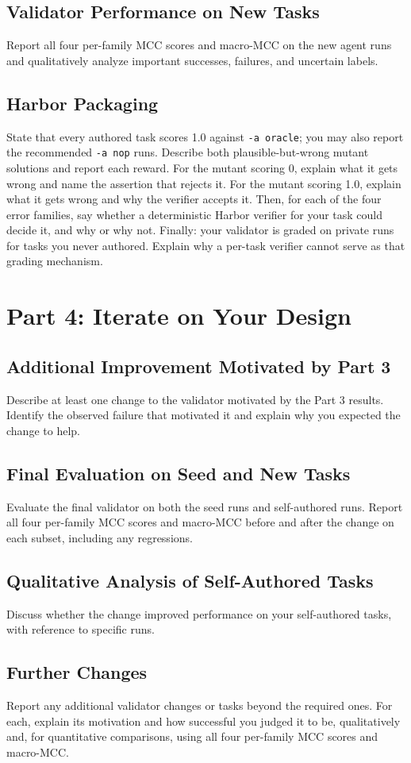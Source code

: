 \documentclass[11pt]{article}
\begin{document}
\subsection{Validator Performance on New Tasks}
Report all four per-family MCC scores and macro-MCC on the new agent runs and qualitatively
analyze important successes, failures, and uncertain labels.

\subsection{Harbor Packaging}
State that every authored task scores 1.0 against \texttt{-a oracle}; you may
also report the recommended \texttt{-a nop} runs. Describe both plausible-but-wrong
mutant solutions and report each reward. For the mutant scoring 0, explain what
it gets wrong and name the assertion that rejects it. For the mutant scoring
1.0, explain what it gets wrong and why the verifier accepts it. Then, for each
of the four error families, say whether a deterministic Harbor verifier for your
task could decide it, and why or why not. Finally: your validator is graded on
private runs for tasks you never authored. Explain why a per-task verifier
cannot serve as that grading mechanism.

\section{Part 4: Iterate on Your Design}

\subsection{Additional Improvement Motivated by Part 3}
Describe at least one change to the validator motivated by the Part 3 results.
Identify the observed failure that motivated it and explain why you expected
the change to help.

\subsection{Final Evaluation on Seed and New Tasks}
Evaluate the final validator on both the seed runs and self-authored runs.
Report all four per-family MCC scores and macro-MCC before and after the change on each subset,
including any regressions.

\subsection{Qualitative Analysis of Self-Authored Tasks}
Discuss whether the change improved performance on your self-authored tasks,
with reference to specific runs.

\subsection{Further Changes}
Report any additional validator changes or tasks beyond the required ones.
For each, explain its motivation and how successful you judged it to be,
qualitatively and, for quantitative comparisons, using all four per-family MCC
scores and macro-MCC.
\end{document}
